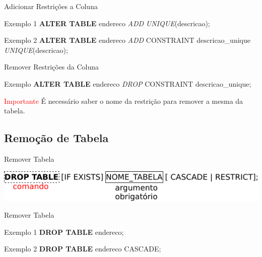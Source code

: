 \documentclass[xcolor=x11names,compress]{beamer}
\begin{document}
\begin{frame}{Adicionar Restrições a Coluna}

\begin{alertblock}{Exemplo 1}
\textbf{ALTER TABLE} endereco \textit{ADD} \textit{UNIQUE}(descricao);
\end{alertblock}

\begin{alertblock}{Exemplo 2}
\textbf{ALTER TABLE} endereco \textit{ADD} CONSTRAINT descricao\_unique \textit{UNIQUE}(descricao);
\end{alertblock}

\end{frame}

\begin{frame}{Remover Restrições da Coluna}

\begin{alertblock}{Exemplo}
\textbf{ALTER TABLE} endereco \textit{DROP} CONSTRAINT descricao\_unique;
\end{alertblock}

\begin{alertblock}{\textcolor{red}{Importante}}
É necessário saber o nome da restrição para remover a mesma da tabela.
\end{alertblock}

\end{frame}

\subsection{Remoção de Tabela}

\begin{frame}{Remover Tabela}

\centering \includegraphics[keepaspectratio,width=\textwidth]{drop_table}

\end{frame}

\begin{frame}{Remover Tabela}

\begin{alertblock}{Exemplo 1}
\textbf{DROP TABLE} endereco;
\end{alertblock}

\begin{alertblock}{Exemplo 2}
\textbf{DROP TABLE} endereco CASCADE;
\end{alertblock}

\end{frame}
\end{document}
